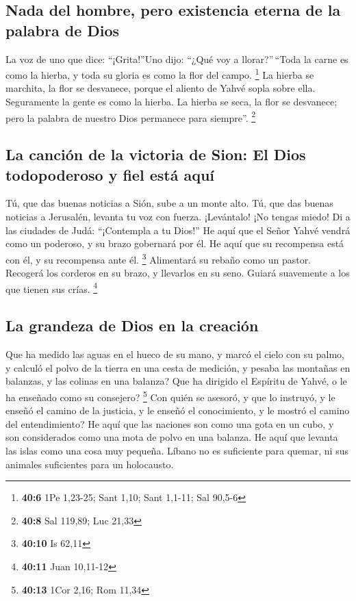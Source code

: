 \begin{paracol}{2}
\hypertarget{nada-del-hombre-pero-existencia-eterna-de-la-palabra-de-dios}{%
\subsection{Nada del hombre, pero existencia eterna de la palabra de
Dios}\label{nada-del-hombre-pero-existencia-eterna-de-la-palabra-de-dios}}

 La voz de uno que dice: ``¡Grita!''Uno dijo: ``¿Qué voy a
llorar?''\,``Toda la carne es como la hierba, y toda su gloria es como
la flor del campo. \footnote{\textbf{40:6} 1Pe 1,23-25; Sant 1,10; Sant
  1,1-11; Sal 90,5-6}  La hierba se marchita, la flor se
desvanece, porque el aliento de Yahvé sopla sobre ella. Seguramente la
gente es como la hierba.  La hierba se seca, la flor se
desvanece; pero la palabra de nuestro Dios permanece para siempre''.
\footnote{\textbf{40:8} Sal 119,89; Luc 21,33}

\hypertarget{la-canciuxf3n-de-la-victoria-de-sion-el-dios-todopoderoso-y-fiel-estuxe1-aquuxed}{%
\subsection{La canción de la victoria de Sion: El Dios todopoderoso y
fiel está
aquí}\label{la-canciuxf3n-de-la-victoria-de-sion-el-dios-todopoderoso-y-fiel-estuxe1-aquuxed}}

 Tú, que das buenas noticias a Sión, sube a un monte alto.
Tú, que das buenas noticias a Jerusalén, levanta tu voz con fuerza.
¡Levántalo! ¡No tengas miedo! Di a las ciudades de Judá: ``¡Contempla a
tu Dios!''  He aquí que el Señor Yahvé vendrá como un
poderoso, y su brazo gobernará por él. He aquí que su recompensa está
con él, y su recompensa ante él. \footnote{\textbf{40:10} Is 62,11}
 Alimentará su rebaño como un pastor. Recogerá los
corderos en su brazo, y llevarlos en su seno. Guiará suavemente a los
que tienen sus crías. \footnote{\textbf{40:11} Juan 10,11-12}

\hypertarget{la-grandeza-de-dios-en-la-creaciuxf3n}{%
\subsection{La grandeza de Dios en la
creación}\label{la-grandeza-de-dios-en-la-creaciuxf3n}}

 Que ha medido las aguas en el hueco de su mano, y marcó
el cielo con su palmo, y calculó el polvo de la tierra en una cesta de
medición, y pesaba las montañas en balanzas, y las colinas en una
balanza?  Que ha dirigido el Espíritu de Yahvé, o le ha
enseñado como su consejero? \footnote{\textbf{40:13} 1Cor 2,16; Rom
  11,34}  Con quién se asesoró, y que lo instruyó, y le
enseñó el camino de la justicia, y le enseñó el conocimiento, y le
mostró el camino del entendimiento?  He aquí que las
naciones son como una gota en un cubo, y son considerados como una mota
de polvo en una balanza. He aquí que levanta las islas como una cosa muy
pequeña.  Líbano no es suficiente para quemar, ni sus
animales suficientes para un holocausto.


\end{paracol}
